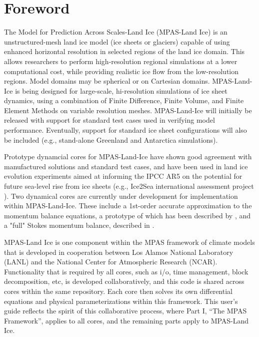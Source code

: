 \chapter*{Foreword}
\label{chap:foreword}

The Model for Prediction Across Scales-Land Ice (MPAS-Land Ice) is an unstructured-mesh land ice model (ice sheets or glaciers) capable of using enhanced horizontal resolution in selected regions of the land ice domain.  This allows researchers to perform high-resolution regional simulations at a lower computational cost, while providing realistic ice flow from the low-resolution regions. Model domains may be spherical or on Cartesian domains.  MPAS-Land-Ice is being designed for large-scale, hi-resolution simulations of ice sheet dynamics, using a combination of Finite Difference, Finite Volume, and Finite Element Methods on variable resolution meshes.  MPAS-Land-Ice will initially be released with support for standard test cases used in verifying model performance. Eventually, support for standard ice sheet configurations will also be included (e.g., stand-alone Greenland and Antarctica simulations).

Prototype dynamcial cores for MPAS-Land-Ice have shown good agreement with manufactured solutions and standard test cases, and have been used in land ice evolution experiments aimed at informing the IPCC AR5 on the potential for future sea-level rise from ice sheets (e.g., Ice2Sea international assessment project \citep{Shannon2013, edwards2014}).  Two dynamical cores are currently under development for implementation within MPAS-Land-Ice. These include a 1st-order accurate approximation to the momentum balance equations, a prototype of which has been described by \citet{perego2012}, and a "full" Stokes momentum balance, described in \citet{Leng2012}. 

MPAS-Land Ice is one component within the MPAS framework of climate models that is developed in cooperation between Los Alamos National Laboratory (LANL) and the National Center for Atmospheric Research (NCAR).  Functionality that is required by all cores, such as i/o, time management, block decomposition, etc, is developed collaboratively, and this code is shared across cores within the same repository.  Each core then solves its own differential equations and physical parameterizations within this framework.  This user's guide reflects the spirit of this collaborative process, where Part I, ``The MPAS Framework'', applies to all cores, and the remaining parts apply to MPAS-Land Ice.

